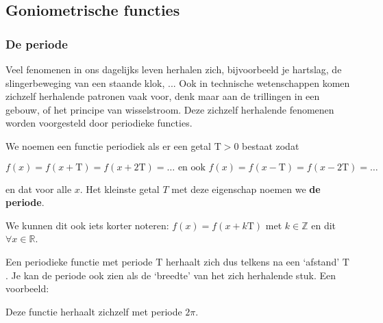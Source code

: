 


\subsection{Goniometrische functies}

\subsubsection{De periode}

Veel fenomenen in ons dagelijks leven herhalen zich, bijvoorbeeld
je hartslag, de slingerbeweging van een staande klok, ... Ook in technische
wetenschappen komen zichzelf herhalende patronen vaak voor, denk maar
aan de trillingen in een gebouw, of het principe van wisselstroom.
Deze zichzelf herhalende fenomenen worden voorgesteld door periodieke
functies.


We noemen een functie periodiek als er een getal $\textrm{T}>0$
bestaat zodat

\begin{equation*}
f(x)=f(x+\textrm{T})=f(x+2\textrm{T})=\ldots \text{ en ook } f(x)=f(x-\textrm{T})=f(x-2\textrm{T})=\ldots
\end{equation*}

en dat voor alle $x$. Het kleinste getal $T$ met deze eigenschap
noemen we \textbf{de periode}.

We kunnen dit ook iets korter noteren: $f(x)=f(x+k\textrm{T})$
met $k\in\mathbb{Z}$ en dit $\forall x\in\mathbb{R}$.


Een periodieke functie met periode $\textrm{T}$ herhaalt zich dus
telkens na een \textquoteleft afstand\textquoteright{} $\textrm{T}$.
Je kan de periode ook zien als de \textquoteleft breedte\textquoteright{}
van het zich herhalende stuk. Een voorbeeld:




Deze functie herhaalt zichzelf met periode $2\pi$.

